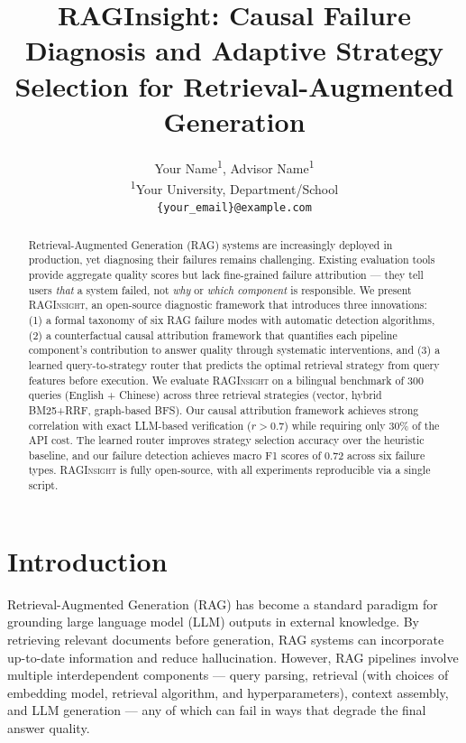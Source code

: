 \documentclass[11pt,a4paper]{article}
\title{RAGInsight: Causal Failure Diagnosis and Adaptive Strategy Selection for Retrieval-Augmented Generation}
\author{
  Your Name\textsuperscript{1}, Advisor Name\textsuperscript{1} \\
  \textsuperscript{1}Your University, Department/School \\
  \texttt{\{your_email\}@example.com}
}
\begin{document}
\maketitle

\begin{abstract}
Retrieval-Augmented Generation (RAG) systems are increasingly deployed in production, yet diagnosing their failures remains challenging. Existing evaluation tools provide aggregate quality scores but lack fine-grained failure attribution — they tell users \textit{that} a system failed, not \textit{why} or \textit{which component} is responsible. We present \textsc{RAGInsight}, an open-source diagnostic framework that introduces three innovations: (1) a formal taxonomy of six RAG failure modes with automatic detection algorithms, (2) a counterfactual causal attribution framework that quantifies each pipeline component's contribution to answer quality through systematic interventions, and (3) a learned query-to-strategy router that predicts the optimal retrieval strategy from query features before execution. We evaluate \textsc{RAGInsight} on a bilingual benchmark of 300 queries (English + Chinese) across three retrieval strategies (vector, hybrid BM25+RRF, graph-based BFS). Our causal attribution framework achieves strong correlation with exact LLM-based verification ($r > 0.7$) while requiring only 30\% of the API cost. The learned router improves strategy selection accuracy over the heuristic baseline, and our failure detection achieves macro F1 scores of 0.72 across six failure types. \textsc{RAGInsight} is fully open-source, with all experiments reproducible via a single script.
\end{abstract}

\section{Introduction}

Retrieval-Augmented Generation (RAG) \cite{lewis2020rag} has become a standard paradigm for grounding large language model (LLM) outputs in external knowledge. By retrieving relevant documents before generation, RAG systems can incorporate up-to-date information and reduce hallucination. However, RAG pipelines involve multiple interdependent components — query parsing, retrieval (with choices of embedding model, retrieval algorithm, and hyperparameters), context assembly, and LLM generation — any of which can fail in ways that degrade the final answer quality.
\end{document}
